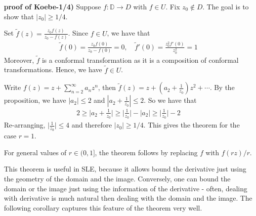 \documentclass[12pt,a4paper]{article}
\newenvironment{proof}
{\begin{changemargin}{0.5cm}{0.5cm} 
	}%
	{\end{changemargin}
}
\begin{document}
\begin{proof}
\textbf{proof of Koebe-1/4)} Suppose $f: \mathbb{D} \rightarrow D$ with $f\in U$. Fix $z_0 \not\in D$. The goal is to show that $|z_0| \geq 1/4$.

\quad Set $\tilde{f}(z) = \frac{z_0f(z)}{z_0- f(z)}$. Since $f\in U$, we have that
\begin{align*}
\tilde{f}(0) = \frac{z_0 f(0)}{z_0 - f(0)}=0, \quad \tilde{f}'(0)= \frac{z_0^2 f'(0)}{z_0^2} =1
\end{align*}
Moreover, $\tilde{f}$ is a conformal transformation as it is a composition of conformal transformations. Hence, we have $\tilde{f} \in U$.

\quad Write $f(z) = z + \sum_{n=2}^{\infty} a_n z^n$, then $\tilde{f}(z) = z+ (a_2 + \frac{1}{z_0})z^2 + \cdots$. By the proposition, we have $|a_2|\leq 2$ and $|a_2 + \frac{1}{z_0}|\leq 2$. So we have that
\begin{align*}
2\geq \Big|a_2 + \frac{1}{z_0}\Big| \geq \Big| \frac{1}{z_0} \Big| - |a_2| \geq \Big| \frac{1}{z_0} \Big| -2 
\end{align*}
Re-arranging, $\Big| \frac{1}{z_0}\Big| \leq 4$ and therefore $|z_0| \geq 1/4$. This gives the theorem for the case $r=1$.

\quad For general values of $r\in (0,1]$, the theorem follows by replacing $f$ with $f(rz)/r$.

\eop
\end{proof}

This theorem is useful in SLE, because it allows bound the derivative just using the geometry of the domain and the image. Conversely, one can bound the domain or the image just using the information of the derivative - often, dealing with derivative is much natural then dealing with the domain and the image. The following corollary captures this feature of the theorem very well.
\s
\end{document}
